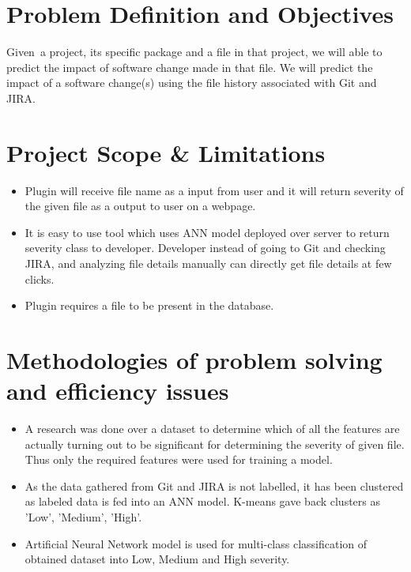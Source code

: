 \documentclass[oneside,a4paper,12pt]{book}
\begin{document}
\setlength{\parskip}{9.96pt}
\pagebreak \par

\section{Problem Definition and Objectives}
\begin{justify}
Given\ a project, its specific package and a file in that project, we will able to predict the impact of software change  made in that file. We will predict the impact of a software change(s) using the file history associated with Git and JIRA.
\end{justify}\par

\section{Project Scope \& Limitations }
\setlength{\parskip}{0.0pt}
\begin{itemize}
	\item Plugin will receive file name as a input from user and it will return severity of the given file as a output to user on a webpage.\par

\setlength{\parskip}{9.96pt}
	\item It is easy to use tool which uses ANN model deployed over server to return severity class to developer. Developer instead of going to Git and checking JIRA, and analyzing file details manually can directly get file details at few clicks.\par
	
	\item Plugin requires a file to be present in the database.\par
\end{itemize}

\section{Methodologies of problem solving and efficiency issues}
\setlength{\parskip}{0.0pt}
\begin{itemize}
    \item
     A research was done over a dataset to determine which of all the features are actually turning out to be significant for determining the severity of given file. Thus only the required features were used for training a model.
    \par
    \item
    As the data gathered from Git and JIRA is not labelled, it has been clustered as labeled data is fed into an ANN model. K-means gave back clusters as 'Low', 'Medium', 'High'.
    \par
    	\item Artificial Neural Network model is used  for multi-class classification of obtained dataset into Low, Medium and High severity.\par
\end{itemize}
\end{document}
